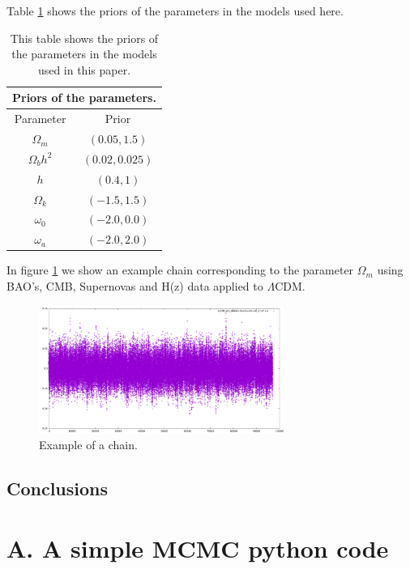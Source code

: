 \documentclass[onecolumn,           %
               showpacs,            %
               preprintnumbers,     %
               aps,                 %
               letterpaper,             %
               superscriptaddress,      %
               nofootinbib,         %
               tightenlines,        %
               floats,floatfix      %
               ,usenatbib,
               ]{revtex4-1}
\begin{document}
Table \ref{tablapriors} shows the priors of the parameters in the models used here.

\begin{table} [htbp]
	\begin{center}
		\begin{tabular}{|c|c|}
			\multicolumn{2}{c}{\textbf{Priors of the parameters.}}\\
			\hline
			Parameter & Prior \\
			\hline
			$\Omega_m$ & $\left(0.05, 1.5\right)$  \\
			\hline
			$\Omega_b h^2$ & $\left(0.02, 0.025\right)$ \\
			\hline
			$h$ & $\left(0.4, 1\right)$ \\
			\hline
			$\Omega_k$ & $\left(-1.5, 1.5\right)$ \\
			\hline
			$\omega_0$ & $\left(-2.0, 0.0\right)$ \\
			\hline
			$\omega_a$ & $\left(-2.0, 2.0\right)$\\
			\hline
		\end{tabular}
		\caption{This table shows the priors of the parameters in the models used in this paper.}
		\label{tablapriors}
	\end{center}
\end{table} 

In figure \ref{examplechain} we show an example chain corresponding to the parameter $\Omega_m$ using BAO's, CMB, Supernovas and H(z) data applied to $\Lambda$CDM.

\begin{figure}[htp]
	\centering
	\includegraphics[width=8cm]{FiguresCosmo/chain_cosmo.pdf}	
	\caption{Example of a chain.}
	\label{examplechain}
\end{figure}

\subsection{Conclusions}
\appendix
\section{A. A simple MCMC python code}
\end{document}
